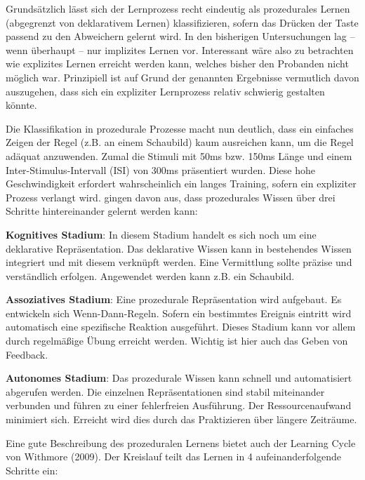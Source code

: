 \documentclass[doc,a4paper,12pt]{apa6}
\begin{document}
Grundsätzlich lässt sich der Lernprozess recht eindeutig als prozedurales Lernen (abgegrenzt von deklarativem Lernen) klassifizieren, sofern das Drücken der Taste passend zu den Abweichern gelernt wird. In den bisherigen Untersuchungen lag – wenn überhaupt – nur implizites Lernen vor. Interessant wäre also zu betrachten wie explizites Lernen erreicht werden kann, welches bisher den Probanden nicht möglich war. Prinzipiell ist auf Grund der genannten Ergebnisse vermutlich davon auszugehen, dass sich ein expliziter Lernprozess relativ schwierig gestalten könnte.

Die Klassifikation in prozedurale Prozesse macht nun deutlich, dass ein einfaches Zeigen der Regel (z.B. an einem Schaubild) kaum ausreichen kann, um die Regel adäquat anzuwenden. Zumal die Stimuli mit 50ms bzw. 150ms Länge und einem Inter-Stimulus-Intervall (ISI) von 300ms präsentiert wurden. Diese hohe Geschwindigkeit erfordert wahrscheinlich ein langes Training, sofern ein expliziter Prozess verlangt wird. \textcite{fitts1967human} gingen davon aus, dass prozedurales Wissen über drei Schritte hintereinander gelernt werden kann:

\begin{compactenum}
  \item \textbf{Kognitives Stadium}: In diesem Stadium handelt es sich noch um eine deklarative Repräsentation. Das deklarative Wissen kann in bestehendes Wissen integriert und mit diesem verknüpft werden. Eine Vermittlung sollte präzise und verständlich erfolgen. Angewendet werden kann z.B. ein Schaubild.
  \item \textbf{Assoziatives Stadium}: Eine prozedurale Repräsentation wird aufgebaut. Es entwickeln sich Wenn-Dann-Regeln. Sofern ein bestimmtes Ereignis eintritt wird automatisch eine spezifische Reaktion ausgeführt. Dieses Stadium kann vor allem durch regelmäßige Übung erreicht werden. Wichtig ist hier auch das Geben von Feedback.
  \item \textbf{Autonomes Stadium}: Das prozedurale Wissen kann schnell und automatisiert abgerufen werden. Die einzelnen Repräsentationen sind stabil miteinander verbunden und führen zu einer fehlerfreien Ausführung. Der Ressourcenaufwand minimiert sich. Erreicht wird dies durch das Praktizieren über längere Zeiträume.
\end{compactenum}

Eine gute Beschreibung des prozeduralen Lernens bietet auch der Learning Cycle von Withmore (2009). Der Kreislauf teilt das Lernen in 4 aufeinanderfolgende Schritte ein:
\end{document}

